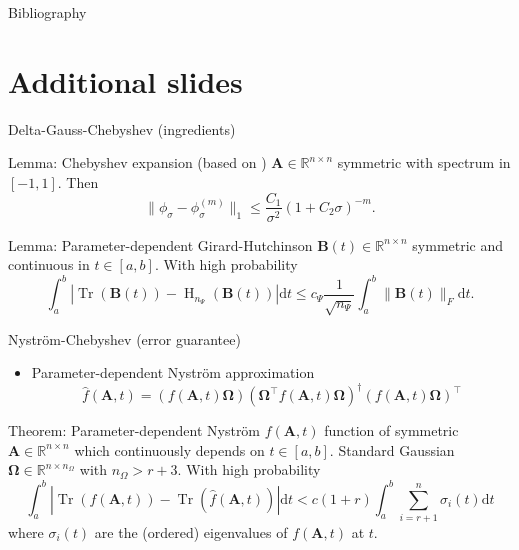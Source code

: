 \documentclass[aspectratio=169, leqno, 12pt]{beamer}
\newcommand{\mtx}[1]{\boldsymbol{#1}}
\DeclareMathOperator{\Tr}{Tr}
\DeclareMathOperator{\Hutch}{H}
\begin{document}
\begin{frame}[allowframebreaks]{Bibliography}
    
\end{frame}

\appendix
\section{Additional slides}

\begin{frame}{Delta-Gauss-Chebyshev (ingredients)}
    \begin{block}{Lemma: Chebyshev expansion (based on \cite{trefethen2008gauss})}
        $\mtx{A} \in \mathbb{R}^{n \times n}$ symmetric with spectrum
        in $[-1, 1]$. Then
        \begin{equation}
            \lVert  \phi_{\sigma} - \phi_{\sigma}^{(m)} \rVert _1 \leq \frac{C_1}{\sigma^2}(1 + C_2 \sigma)^{-m}.
        \end{equation}
    \end{block}
    \begin{block}{Lemma: Parameter-dependent Girard-Hutchinson \cite{he2023parameter}}
        $\mtx{B}(t) \in \mathbb{R}^{n \times n}$ symmetric and continuous in
        $t \in [a, b]$. With high probability
        \begin{equation}
            \int_{a}^{b} \left| \Tr(\mtx{B}(t)) - \Hutch_{n_{\Psi}}(\mtx{B}(t)) \right| \mathrm{d}t \leq c_{\Psi} \frac{1}{\sqrt{n_{\Psi}}} \int_{a}^{b} \lVert \mtx{B}(t) \rVert _F \mathrm{d}t.
        \end{equation}
    \end{block}
\end{frame}

\begin{frame}{Nystr\"om-Chebyshev (error guarantee)}
    \begin{itemize}
        \item Parameter-dependent Nystr\"om approximation
        \begin{equation}
            \widehat{f}(\mtx{A}, t) = (f(\mtx{A}, t) \mtx{\Omega}) (\mtx{\Omega}^{\top} f(\mtx{A}, t) \mtx{\Omega})^{\dagger} (f(\mtx{A}, t) \mtx{\Omega})^{\top}
        \end{equation}
    \end{itemize}
    \begin{block}{Theorem: Parameter-dependent Nystr\"om \cite{he2023parameter}}
        $f(\mtx{A}, t)$ function of symmetric $\mtx{A} \in \mathbb{R}^{n \times n}$ which
        continuously depends on $t \in [a,b]$. 
        Standard Gaussian $\mtx{\Omega} \in \mathbb{R}^{n \times n_{\Omega}}$
        with $n_{\Omega} > r + 3$. With high probability
        \begin{equation}
            \int_{a}^{b} | \Tr(f(\mtx{A}, t)) - \Tr(\widehat{f}(\mtx{A}, t))| \mathrm{d}t
                < c (1 + r) \int_{a}^{b} \sum_{i = r+1}^n \sigma_i(t) \mathrm{d}t
        \end{equation}
        where $\sigma_i(t)$ are the (ordered) eigenvalues of $f(\mtx{A}, t)$ at $t$.
    \end{block}
\end{frame}
\end{document}
